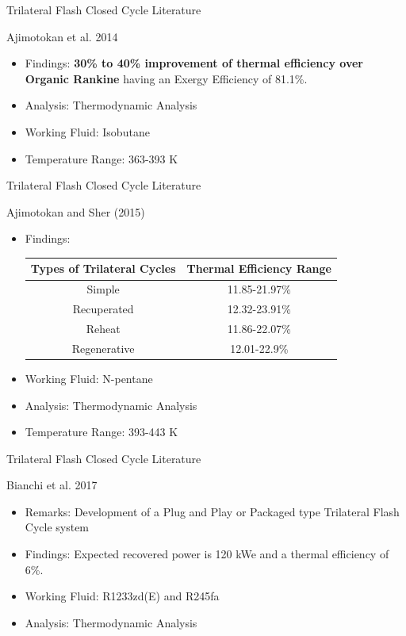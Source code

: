 \begin{frame}{Trilateral Flash Closed Cycle Literature}
    \begin{block}{Ajimotokan et al. 2014\cite{ajimotokan2014trilateral}}
     \begin{itemize}
         \item Findings: \textbf{30\% to 40\% improvement of thermal efficiency over Organic Rankine} having an Exergy Efficiency of 81.1\%.
         \item Analysis: Thermodynamic Analysis
         \item Working Fluid: Isobutane
         \item Temperature Range: 363-393 K
     \end{itemize}
    \end{block}
\end{frame}

\begin{frame}{Trilateral Flash Closed Cycle Literature}
    \begin{block}{Ajimotokan and Sher (2015)\cite{ajimotokan2015thermodynamic}}
    \begin{itemize}
        \item Findings:
     \begin{table}[h]
         \centering
         \begin{tabular}{cc}
         \hline
             Types of Trilateral Cycles & Thermal Efficiency Range \\
        \hline
              Simple & 11.85-21.97\% \\
              Recuperated & 12.32-23.91\% \\
              Reheat & 11.86-22.07\% \\
              Regenerative & 12.01-22.9\% \\
        \hline
         \end{tabular}
     \end{table}
         \item Working Fluid: N-pentane
         \item Analysis: Thermodynamic Analysis
         \item Temperature Range: 393-443 K
     \end{itemize}
    \end{block}
\end{frame}

\begin{frame}{Trilateral Flash Closed Cycle Literature}
    \begin{block}{Bianchi et al. 2017\cite{bianchi2017numerical}}
     \begin{itemize}
         \item Remarks: Development of a Plug and Play or Packaged type Trilateral Flash Cycle system
         \item Findings: Expected recovered power is 120 kWe and a thermal efficiency of 6\%.
         \item Working Fluid: R1233zd(E) and R245fa
         \item Analysis: Thermodynamic Analysis
     \end{itemize}
    \end{block}
\end{frame}

